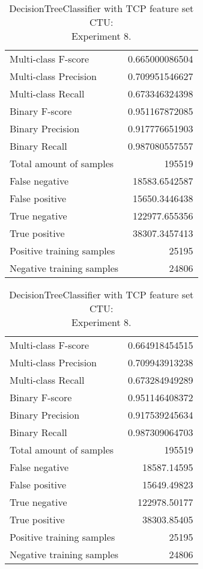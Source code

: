 \begin{table}[H]
\begin{minipage}{0.5\textwidth}
\caption{DecisionTreeClassifier with TCP feature set CTU: \\Experiment 7.}
\centering
\begin{tabular}{l r}
\toprule
Multi-class F-score & 0.665000086504 \\
Multi-class Precision & 0.709951546627 \\
Multi-class Recall & 0.673346324398 \\
\midrule
Binary F-score & 0.951167872085 \\
Binary Precision & 0.917776651903 \\
Binary Recall & 0.987080557557 \\
\midrule
Total amount of samples & 195519 \\
False negative & 18583.6542587 \\
False positive & 15650.3446438 \\
True negative & 122977.655356 \\
True positive & 38307.3457413 \\
\midrule
Positive training samples & 25195 \\
Negative training samples & 24806 \\
\bottomrule
\end{tabular}
\end{minipage}
\hfillx
\begin{minipage}{0.5\textwidth}
\caption{DecisionTreeClassifier with TCP feature set CTU: \\Experiment 8.}
\centering
\begin{tabular}{l r}
\toprule
Multi-class F-score & 0.664918454515 \\
Multi-class Precision & 0.709943913238 \\
Multi-class Recall & 0.673284949289 \\
\midrule
Binary F-score & 0.951146408372 \\
Binary Precision & 0.917539245634 \\
Binary Recall & 0.987309064703 \\
\midrule
Total amount of samples & 195519 \\
False negative & 18587.14595 \\
False positive & 15649.49823 \\
True negative & 122978.50177 \\
True positive & 38303.85405 \\
\midrule
Positive training samples & 25195 \\
Negative training samples & 24806 \\
\bottomrule
\end{tabular}
\end{minipage}
\end{table}
